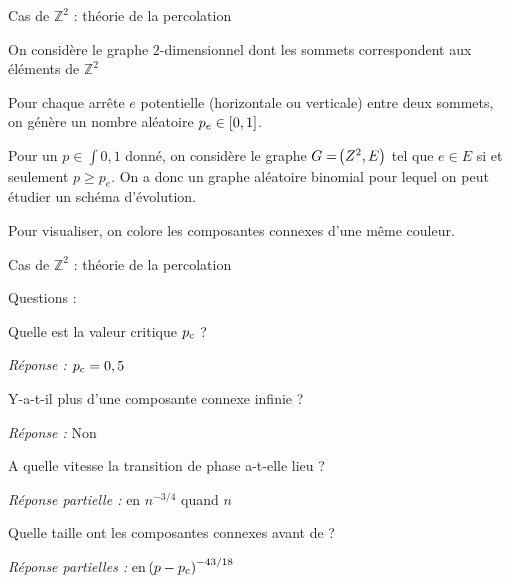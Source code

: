 \documentclass[french,bookmarks]{beamer}
\newcommand{\bdZ}{\mathbb{Z}}
\begin{document}
\begin{frame}{Cas de $\bdZ^2$ : théorie de la percolation}
    \begin{enumerate}
        \itt On considère le graphe $2$-dimensionnel dont les sommets correspondent aux éléments de $\bdZ^2$\pause
        
        \itt Pour chaque arrête $e$ potentielle (horizontale ou verticale) entre deux sommets, on génère un nombre aléatoire $p_e \in \left[0, 1\right]$.\pause
        
        \itt Pour un $p \in \int{0, 1}$ donné, on considère le graphe $G = \!\left(Z^2, E\right)$ tel que $e \in E$ si et seulement $p \geq p_e$. On a donc un graphe aléatoire binomial pour lequel on peut étudier un schéma d'évolution.\pause
        
        \itt Pour visualiser, on colore les composantes connexes d'une même couleur.
    \end{enumerate}
\end{frame}

\begin{frame}{Cas de $\bdZ^2$ : théorie de la percolation}
    
    Questions :
    \begin{enumerate}
         Quelle est la valeur critique $p_\text c$ ?
        
         \emph{Réponse :} $p_\text c = 0,5$
        
         Y-a-t-il plus d'une composante connexe infinie ?
        
         \emph{Réponse :} Non
        
         A quelle vitesse la transition de phase a-t-elle lieu ?
        
         \emph{Réponse partielle :}  en $n^{-3/4}$ quand $n$
        
         Quelle taille ont les composantes connexes avant de  ?
        
         \emph{Réponse partielles :}  en $\!\left(p - p_\text c\right)^{-43/18}$
    \end{enumerate}
\end{frame}
\end{document}
